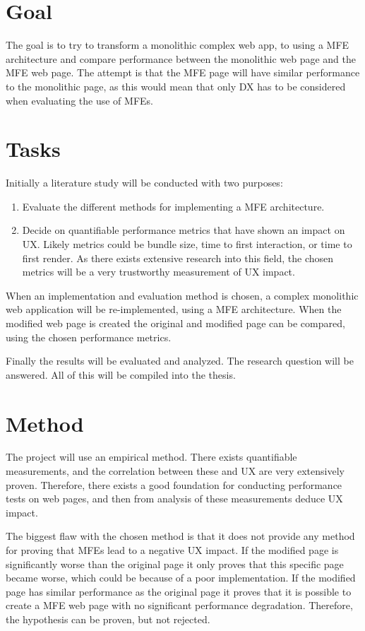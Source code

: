 \section{Goal}
The goal is to try to transform a monolithic complex web app, to using a \ac{MFE} architecture and compare performance between the monolithic web page and the \ac{MFE} web page. The attempt is that the \ac{MFE} page will have similar performance to the monolithic page, as this would mean that only \ac{DX} has to be considered when evaluating the use of \acp{MFE}.

\section{Tasks}
Initially a literature study will be conducted with two purposes:

\begin{enumerate}
    \item Evaluate the different methods for implementing a \ac{MFE} architecture.
    \item Decide on quantifiable performance metrics that have shown an impact on \ac{UX}. Likely metrics could be bundle size, time to first interaction, or time to first render. As there exists extensive research into this field, the chosen metrics will be a very trustworthy measurement of \ac{UX} impact.
\end{enumerate}

When an implementation and evaluation method is chosen, a complex monolithic web application will be re-implemented, using a \ac{MFE} architecture. When the modified web page is created the original and modified page can be compared, using the chosen performance metrics.

Finally the results will be evaluated and analyzed. The research question will be answered. All of this will be compiled into the thesis.

\section{Method}
The project will use an empirical method. There exists quantifiable measurements, and the correlation between these and \ac{UX} are very extensively proven. Therefore, there exists a good foundation for conducting performance tests on web pages, and then from analysis of these measurements deduce \ac{UX} impact.

The biggest flaw with the chosen method is that it does not provide any method for proving that \acp{MFE} lead to a negative \ac{UX} impact. If the modified page is significantly worse than the original page it only proves that this specific page became worse, which could be because of a poor implementation. If the modified page has similar performance as the original page it proves that it is possible to create a \ac{MFE} web page with no significant performance degradation. Therefore, the hypothesis can be proven, but not rejected.

